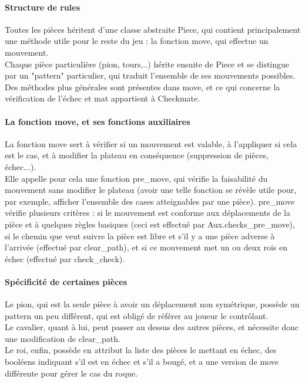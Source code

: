\documentclass[a4paper]{article}
\begin{document}
\paragraph{Structure de rules} Toutes les pièces héritent d'une classe abstraite Piece, qui contient principalement une méthode utile pour le reste du jeu : la fonction move, qui effectue un mouvement. \\
Chaque pièce particulière (pion, tours,..) hérite ensuite de Piece et se distingue par un "pattern" particulier, qui traduit l'ensemble de ses mouvements possibles.  \\
Des méthodes plus générales sont présentes dans move, et ce qui concerne la vérification de l'échec et mat appartient à Checkmate.

\paragraph{La fonction move, et ses fonctions auxiliaires} La fonction move sert à vérifier si un mouvement est valable, à l'appliquer si cela est le cas, et à modifier la plateau en conséquence (suppression de pièces, échec...). \\
Elle appelle pour cela une fonction pre\_move, qui vérifie la faisabilité du mouvement sans modifier le plateau (avoir une telle fonction se révèle utile pour, par exemple, afficher l'ensemble des cases atteignables par une pièce).
pre\_move vérifie plusieurs critères : si le mouvement est conforme aux déplacements de la pièce et à quelques règles basiques (ceci est effectué par Aux.checks\_pre\_move), si le chemin que veut suivre la pièce est libre et s'il y a une pièce adverse à l'arrivée (effectué par clear\_path), et si ce mouvement met un ou deux rois en échec (effectué par check\_check). \\

\paragraph{Spécificité de certaines pièces} Le pion, qui est la seule pièce à avoir un déplacement non symétrique, possède un pattern un peu différent, qui est obligé de référer au joueur le contrôlant. \\
Le cavalier, quant à lui, peut passer au dessus des autres pièces, et nécessite donc une modification de clear\_path. \\
Le roi, enfin, possède en attribut la liste des pièces le mettant en échec, des booléens indiquant s'il est en échec et s'il a bougé, et a une version de move différente pour gérer le cas du roque.  \\
\end{document}
